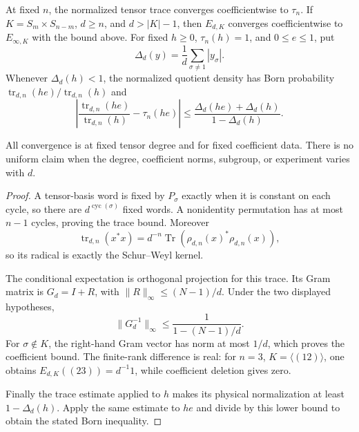 \begin{theorem}
{\normalfont\statusProved}\quad At fixed $n$, the normalized tensor trace
converges coefficientwise to $\tau_n$.  If $K=S_m\times S_{n-m}$,
$d\geq n$, and $d>|K|-1$, then $E_{d,K}$ converges coefficientwise to
$E_{\infty,K}$ with the bound above.  For fixed $h\geq0$,
$\tau_n(h)=1$, and $0\leq e\leq1$, put
\[
 \Delta_d(y)=\frac1d\sum_{\sigma\ne1}|y_\sigma|.
\]
Whenever $\Delta_d(h)<1$, the normalized quotient density has Born
probability $\operatorname{tr}_{d,n}(he)/\operatorname{tr}_{d,n}(h)$ and
\[
 \left|\frac{\operatorname{tr}_{d,n}(he)}{\operatorname{tr}_{d,n}(h)}
       -\tau_n(he)\right|
 \leq\frac{\Delta_d(he)+\Delta_d(h)}{1-\Delta_d(h)}.
\]
\end{theorem}
\begin{scope}
All convergence is at fixed tensor degree and for fixed coefficient data.
There is no uniform claim when the degree, coefficient norms, subgroup, or
experiment varies with $d$.
\end{scope}
\begin{proof}
A tensor-basis word is fixed by $P_\sigma$ exactly when it is constant on
each cycle, so there are $d^{\operatorname{cyc}(\sigma)}$ fixed words.  A
nonidentity permutation has at most $n-1$ cycles, proving the trace bound.
Moreover
\[
 \operatorname{tr}_{d,n}(x^*x)
 =d^{-n}\operatorname{Tr}(\rho_{d,n}(x)^*\rho_{d,n}(x)),
\]
so its radical is exactly the Schur--Weyl kernel.

The conditional expectation is orthogonal projection for this trace.  Its
Gram matrix is $G_d=I+R$, with
$\lVert R\rVert_\infty\leq(N-1)/d$.  Under the two displayed hypotheses,
\[
 \lVert G_d^{-1}\rVert_\infty
 \leq\frac{1}{1-(N-1)/d}.
\]
For $\sigma\notin K$, the right-hand Gram vector has norm at most $1/d$,
which proves the coefficient bound.  The finite-rank difference is real: for
$n=3$, $K=\langle(12)\rangle$, one obtains
$E_{d,K}((23))=d^{-1}1$, while coefficient deletion gives zero.

Finally the trace estimate applied to $h$ makes its physical normalization
at least $1-\Delta_d(h)$.  Apply the same estimate to $he$ and divide by
this lower bound to obtain the stated Born inequality.
\end{proof}

